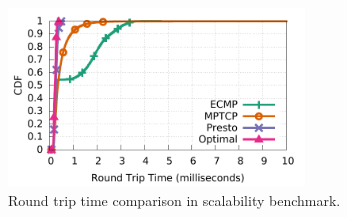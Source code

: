 \begin{figure}[!t]
        \centering
  \includegraphics[width=0.7\textwidth]{presto/figures/scalability_test/scalability_compare_latency.pdf}
        \caption{Round trip time comparison in scalability benchmark. 
		}
        \label{micro_scalability_test_latency}
\end{figure}


